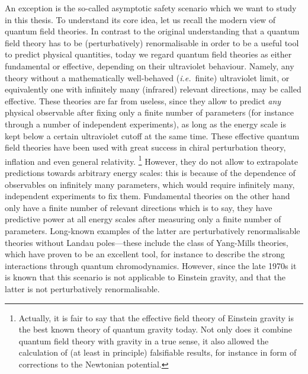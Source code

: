 \documentclass[11pt]{book}
\newcommand\ie{\textit{i.e.}\ }
\numberwithin{equation}{chapter}
\begin{document}
An exception is the so-called asymptotic safety scenario which we want to study
in this thesis. To understand its core idea, let us recall the modern view of
quantum field theories. In contrast to the original understanding that a quantum
field theory has to be (perturbatively) renormalisable in order to be a useful
tool to predict physical quantities, today we regard quantum field theories
as either fundamental or effective, depending on their ultraviolet behaviour.
Namely, any theory without a mathematically well-behaved (\ie finite) ultraviolet
limit, or equivalently one with infinitely many (infrared) relevant directions,
may be called effective. These theories are far from useless, since they allow
to predict \textit{any} physical observable after fixing
only a finite number of parameters
(for instance through a number of independent experiments),
as long as the energy scale is kept below a certain ultraviolet cutoff at the
same time. These effective quantum field theories have been used with great success
in chiral perturbation theory, inflation and even general relativity.%
\footnote{%
  Actually, it is fair to say that the effective field theory of Einstein gravity
  is the best known theory of quantum gravity today. Not only does it combine
  quantum field theory with gravity in a true sense, it also allowed the calculation
  of (at least in principle) falsifiable results, for instance in form of
  corrections to the Newtonian potential.
}
However, they do not allow to extrapolate predictions towards arbitrary energy scales:
this is because of the dependence of observables on infinitely many parameters, which
would require infinitely many, independent experiments to fix them. Fundamental
theories on the other hand only have a finite number of relevant directions which is
to say, they have predictive power at all energy scales after measuring only a
finite number of parameters. Long-known examples of the latter are perturbatively
renormalisable theories without Landau poles---these include the class of Yang-Mills theories,
which have proven to be an excellent tool,
for instance to describe the strong interactions through quantum chromodynamics.
However, since the late 1970s it is known that this scenario is not applicable to
Einstein gravity, and that the latter is not perturbatively renormalisable.
\end{document}
